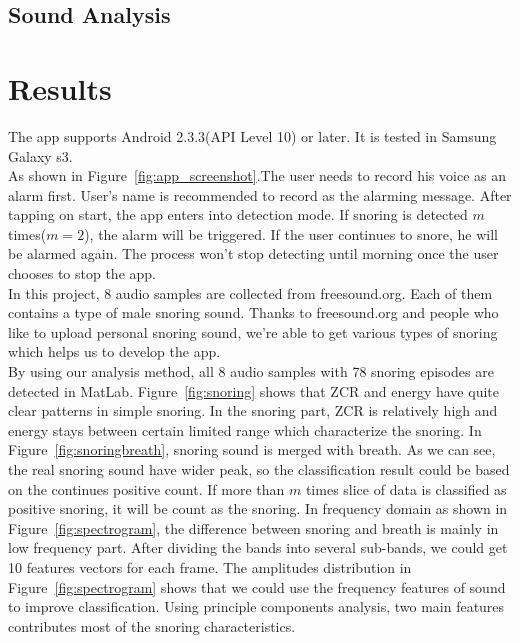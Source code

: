 \documentclass[conference]{IEEEtran}
\begin{document}

\subsection{Sound Analysis} %
\label{sub:sound_analysis}



\section{Results} %
\label{sec:results}
The app supports Android 2.3.3(API Level 10) or later. It is tested in Samsung Galaxy s3.\\

As shown in Figure~\ref{fig:app_screenshot}.The user needs to record his voice as an alarm first. User's name is recommended to record as the alarming message. After tapping on start, the app enters into detection mode. If snoring is detected $ m $ times($ m = 2 $), the alarm will be triggered. If the user continues to snore, he will be alarmed again. The process won't stop detecting until morning once the user chooses to stop the app.\\

In this project, 8 audio samples are collected from freesound.org. Each of them contains a type of male snoring sound. Thanks to freesound.org and people who like to upload personal snoring sound, we're able to get various types of snoring which helps us to develop the app. \\

By using our analysis method, all 8 audio samples with 78 snoring episodes are detected in MatLab. Figure~\ref{fig:snoring} shows that ZCR and energy have quite clear patterns in simple snoring. In the snoring part, ZCR is relatively high and energy stays between certain limited range which characterize the snoring. In Figure~\ref{fig:snoringbreath}, snoring sound is merged with breath. As we can see, the real snoring sound have wider peak, so the classification result could be based on the continues positive count. If more than $m$ times slice of data is classified as positive snoring, it will be count as the snoring. In frequency domain as shown in Figure~\ref{fig:spectrogram}, the difference between snoring and breath is mainly in low frequency part. After dividing the bands into several sub-bands, we could get 10 features vectors for each frame. The amplitudes distribution in Figure~\ref{fig:spectrogram} shows that we could use the frequency features of sound to improve classification. Using principle components analysis, two main features contributes most of the snoring characteristics. \\
\end{document}
